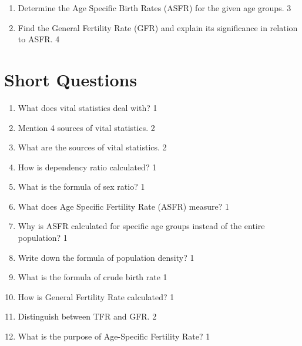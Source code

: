 \documentclass[a4paper,oneside, margin=1.4in]{book}
\begin{document}
\begin{enumerate}
\begin{enumerate}
    \item
    Determine the Age Specific Birth Rates (ASFR) for the given age groups. \hfill 3

    \item
    Find the General Fertility Rate (GFR) and explain its significance in relation to ASFR. \hfill 4
\end{enumerate}

  
  \end{enumerate}

\section{Short Questions}

  \begin{enumerate}
  
  \item What does vital statistics deal with? \hfill 1
  
  \item Mention 4 sources of vital statistics. \hfill 2
  
  \item What are the sources of vital statistics. \hfill 2
  
  \item How is dependency ratio calculated? \hfill 1
  
  \item What is the formula of sex ratio? \hfill 1
  
 \item  What does Age Specific Fertility Rate (ASFR) measure? \hfill 1
 \item Why is ASFR calculated for specific age groups instead of the entire population? \hfill 1
  
  \item Write down the formula of population density? \hfill 1
  
  \item What is the formula of crude birth rate \hfill 1
  
  \item How is General Fertility Rate calculated? \hfill 1
  
  \item Distinguish between TFR and GFR. \hfill 2
  
  \item What is the purpose of Age-Specific Fertility Rate? \hfill 1
  

\end{enumerate}
\end{document}

